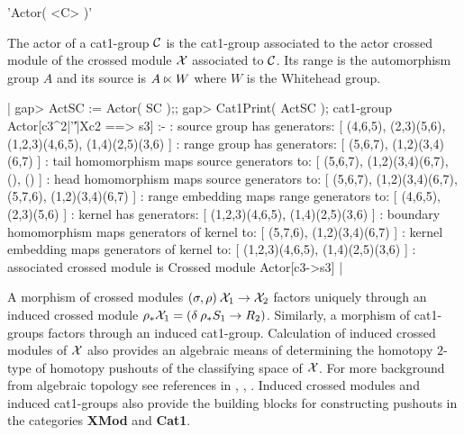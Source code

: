 
'Actor( <C> )'

The actor of  a cat1-group ${\cal C}$ is  the cat1-group associated to
the actor crossed module  of the crossed  module ${\cal X}$ associated
to ${\cal C}$.  Its range is the automorphism group $A$ and its source
is $A \semidirect W$ where $W$ is the Whitehead group.

|    gap> ActSC := Actor( SC );;
    gap> Cat1Print( ActSC );
    cat1-group Actor[c3^2|'\|'|Xc2 ==> s3] :- 
    : source group has generators:
      [ (4,6,5), (2,3)(5,6), (1,2,3)(4,6,5), (1,4)(2,5)(3,6) ]
    :  range group has generators:
      [ (5,6,7), (1,2)(3,4)(6,7) ]
    : tail homomorphism maps source generators to:
      [ (5,6,7), (1,2)(3,4)(6,7), (), () ]
    : head homomorphism maps source generators to:
      [ (5,6,7), (1,2)(3,4)(6,7), (5,7,6), (1,2)(3,4)(6,7) ]
    : range embedding maps range generators to:
      [ (4,6,5), (2,3)(5,6) ]
    : kernel has generators:
      [ (1,2,3)(4,6,5), (1,4)(2,5)(3,6) ]
    : boundary homomorphism maps generators of kernel to:
      [ (5,7,6), (1,2)(3,4)(6,7) ]
    : kernel embedding maps generators of kernel to:
      [ (1,2,3)(4,6,5), (1,4)(2,5)(3,6) ]
    : associated crossed module is Crossed module Actor[c3->s3]  |

\newpage


%

A morphism of crossed modules $(\sigma, \rho) \:  {\cal X}_1 \to {\cal
X}_2$ factors uniquely through an  induced crossed module $\rho_{\ast}
{\cal  X}_1 =   (\delta \: \rho_{\ast}  S_1 \to   R_2)$.  Similarly, a
morphism   of  cat1-groups  factors    through an induced  cat1-group.
Calculation of induced crossed modules of  ${\cal X}$ also provides an
algebraic  means  of determining  the   homotopy $2$-type  of homotopy
pushouts of the classifying space of ${\cal  X}$.  For more background
from   algebraic  topology see  references in  \cite{xmodBH1}, \cite{xmodBW1},
\cite{xmodBW2}.  Induced crossed   modules  and induced cat1-groups   also
provide the   building    blocks for constructing     pushouts  in the
categories
\textbf{XMod} and \textbf{Cat1}.

